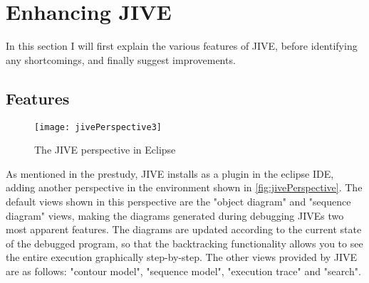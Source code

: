 \section{Enhancing JIVE}\label{enhJive}

In this section I will first explain the various features of JIVE, before identifying any shortcomings, and finally suggest improvements.

\subsection{Features}\label{jiveFeatures}

\begin{figure}[H]
	\centering
	\texttt{[image: jivePerspective3]}
	\caption{The JIVE perspective in Eclipse}
	\label{fig:jivePerspective}
\end{figure}
As mentioned in the prestudy, JIVE installs as a plugin in the eclipse IDE, adding another perspective in the environment shown in \autoref{fig:jivePerspective}.
The default views shown in this perspective are the "object diagram" and "sequence diagram" views, making the diagrams generated during debugging JIVEs two most apparent features.
The diagrams are updated according to the current state of the debugged program, so that the backtracking functionality allows you to see the entire execution graphically step-by-step.
The other views provided by JIVE are as follows: "contour model", "sequence model", "execution trace" and "search".
~\\


